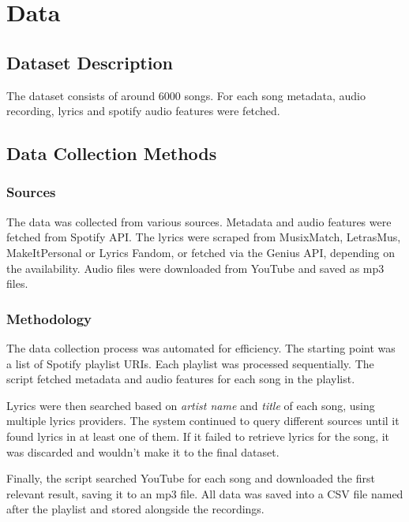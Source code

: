 \chapter{Data}
\label{cha:data}

\section{Dataset Description}
\label{sec:datasetdescription}

The dataset consists of around 6000 songs. For each song metadata, audio
recording, lyrics and spotify audio features were fetched.

\section{Data Collection Methods}
\label{sec:datacollectionmethods}

\subsection{Sources}
The data was collected from various sources. Metadata and audio features
were fetched from Spotify API. The lyrics were scraped from MusixMatch,
LetrasMus, MakeItPersonal or Lyrics Fandom, or fetched via the Genius API,
depending on  the availability. Audio files were downloaded from YouTube and
saved as mp3 files.

\subsection{Methodology}
The data collection process was automated for efficiency. The starting point
was a list of Spotify playlist URIs. Each playlist was processed sequentially. 
The script fetched metadata and audio features for each song in the
playlist.

Lyrics were then searched based on \textit{artist name} and \textit{title} of
each song, using multiple lyrics providers. The system continued to query
different sources until it found lyrics in at least one of them. If it failed
to retrieve lyrics for the song, it was discarded and wouldn't make it to the
final dataset.

Finally, the script  searched YouTube for each song and downloaded the first
relevant result, saving it to an mp3 file. All data was saved into a CSV
file named after the playlist and stored alongside the recordings.

